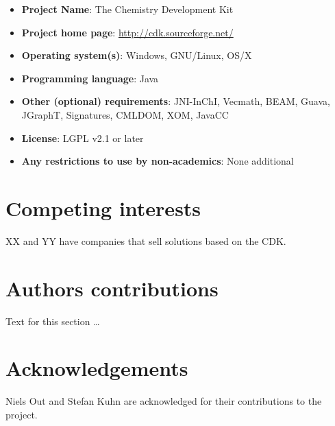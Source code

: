 \documentclass[10pt]{bmc_article}
\newenvironment{bmcformat}{\begin{raggedright}\baselineskip20pt\sloppy\setboolean{publ}{false}}{\end{raggedright}\baselineskip20pt\sloppy}
\begin{document}
\begin{bmcformat}
\begin{itemize}
\item \textbf{Project Name}: The Chemistry Development Kit
\item \textbf{Project home page}: \url{http://cdk.sourceforge.net/}
\item \textbf{Operating system(s)}: Windows, GNU/Linux, OS/X
\item \textbf{Programming language}: Java
\item \textbf{Other (optional) requirements}: JNI-InChI, Vecmath, BEAM, Guava, JGraphT, Signatures, CMLDOM, XOM, JavaCC
\item \textbf{License}: LGPL v2.1 or later
\item \textbf{Any restrictions to use by non-academics}: None additional
\end{itemize}

\section*{Competing interests}
XX and YY have companies that sell solutions based on the CDK.

\section*{Authors contributions}
    Text for this section \ldots

    

\section*{Acknowledgements}
Niels Out and Stefan Kuhn are acknowledged for their contributions to the project.


{
  
}





%



\end{bmcformat}
\end{document}
